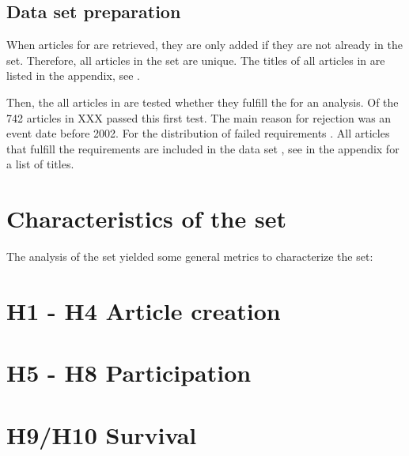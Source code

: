 \subsection{Data set preparation}

When articles for  are retrieved, they are only added if they are not already in the set. 
Therefore, all articles in the set are unique.
The titles of all articles in  are listed in the appendix, see .

Then, the all articles in  are tested whether they fulfill the  for an analysis.
Of the 742 articles in  XXX passed this first test.
The main reason for rejection was an event date before 2002. 
For the distribution of failed requirements .
All articles that fulfill the requirements are included in the data set , see  in the appendix for a list of titles.



%

\section{Characteristics of the set}

The analysis of the set yielded some general metrics to characterize the set:




\section{H1 - H4 Article creation}


\section{H5 - H8 Participation}

\section{H9/H10 Survival}

